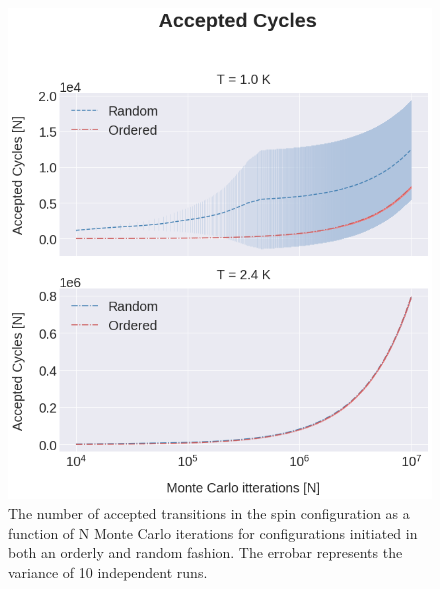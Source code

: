 \documentclass[%
reprint,nofootinbib,
amsmath,amssymb,
aps,
]{revtex4-1}
\begin{document}
\begin{figure}[H]
	\includegraphics[width = \columnwidth]{Figures/Plot2.png} 
	\caption{\label{4C2}The number of accepted transitions in the spin configuration as a function of N Monte Carlo iterations for configurations initiated in both an orderly and random fashion. The errobar represents the variance of 10 independent runs. \vspace{10mm}
	}
\end{figure} 
\end{document}
